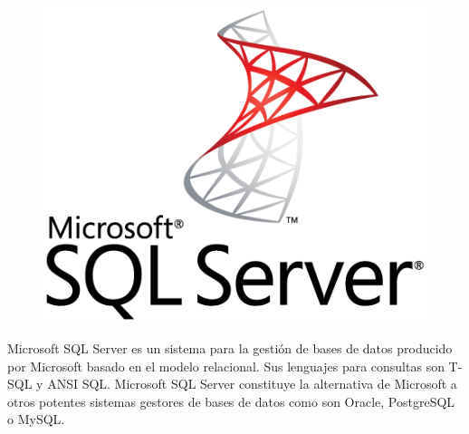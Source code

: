 \begin{figure}
	\includegraphics[scale=.25]{img/sqlserver-logo.png}
\end{figure}

Microsoft SQL Server es un sistema para la gestión de bases de datos producido por Microsoft basado en el modelo relacional. Sus lenguajes para consultas son T-SQL y ANSI SQL. Microsoft SQL Server constituye la alternativa de Microsoft a otros potentes sistemas gestores de bases de datos como son Oracle, PostgreSQL o MySQL.